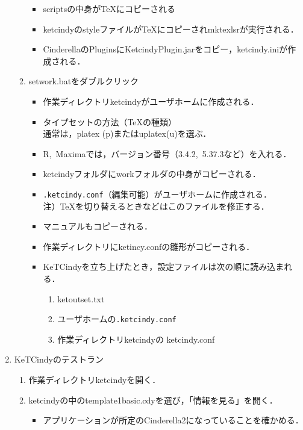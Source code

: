 \documentclass{ujarticle}
\begin{document}
\begin{enumerate}[\bf\large 1.]
\begin{enumerate}[(1)]
\begin{itemize}
    \item scriptsの中身がTeXにコピーされる
    \item ketcindyのstyleファイルがTeXにコピーされmktexlsrが実行される．
    \item CinderellaのPluginsにKetcindyPlugin.jarをコピー，ketcindy.iniが作成される．
    \end{itemize}
  \item setwork.batをダブルクリック
    \begin{itemize} 
    \item 作業ディレクトリketcindyがユーザホームに作成される．
    \item タイプセットの方法（TeXの種類）\\
    \hspace*{10mm}通常は，platex (p)またはuplatex(u)を選ぶ．
    \item R,\ Maximaでは，バージョン番号（3.4.2,\ 5.37.3など）を入れる．
    \item ketcindyフォルダにworkフォルダの中身がコピーされる．
    \item \verb|.ketcindy.conf|（編集可能）がユーザホームに作成される．\\
    \hspace*{10mm}注）TeXを切り替えるときなどはこのファイルを修正する．
    \item マニュアルもコピーされる．
    \item 作業ディレクトリにketincy.confの雛形がコピーされる．
    \item KeTCindyを立ち上げたとき，設定ファイルは次の順に読み込まれる．
      \begin{enumerate}[1)]
      \item ketoutset.txt
      \item ユーザホームの\verb|.ketcindy.conf|
      \item 作業ディレクトリketcindyの ketcindy.conf
      \end{enumerate}
    \end{itemize}
  \end{enumerate}
  \item KeTCindyのテストラン
    \begin{enumerate}[(1)]
    \item 作業ディレクトリketcindyを開く．
    \item ketcindyの中のtemplate1basic.cdyを選び，「情報を見る」を開く．
      \begin{itemize}
      \item アプリケーションが所定のCinderella2になっていることを確かめる．

\end{itemize}
\end{enumerate}
\end{enumerate}
\end{document}
